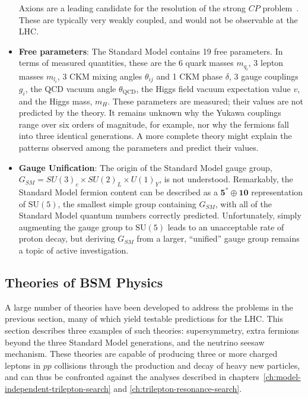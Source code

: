 \begin{itemize}
	Axions are a leading candidate for the resolution of the strong $CP$ problem~\cite{Peccei:400569}. These are typically very weakly coupled, and would not be observable at the LHC.

	\item \textbf{Free parameters}: The Standard Model contains 19 free parameters. In terms of measured quantities, these are the 6 quark masses $m_{q_i}$, 3 lepton masses $m_{l_i}$, 3 CKM mixing angles $\theta_{ij}$ and 1 CKM phase $\delta$, 3 gauge couplings $g_i$, the QCD vacuum angle $\theta_{\mathrm{QCD}}$, the Higgs field vacuum expectation value $v$, and the Higgs mass, $m_H$. These parameters are measured; their values are not predicted by the theory. It remains unknown why the Yukawa couplings range over six orders of magnitude, for example, nor why the fermions fall into three identical generations. A more complete theory might explain the patterns observed among the parameters and predict their values.


	\item \textbf{Gauge Unification}: The origin of the Standard Model gauge group, $G_{SM}=SU(3)_c\times SU(2)_L \times U(1)_Y$, is not understood. Remarkably, the Standard Model fermion content can be described as a $\mathbf{5}^{*}\oplus \mathbf{10}$ representation of $\mathrm{SU}(5)$, the smallest simple group containing $G_{SM}$, with all of the Standard Model quantum numbers correctly predicted. Unfortunately, simply augmenting the gauge group to $\mathrm{SU}(5)$ leads to an unacceptable rate of proton decay, but deriving $G_{SM}$ from a larger, ``unified'' gauge group remains a topic of active investigation.  
\end{itemize}

\subsection{Theories of BSM Physics}\label{sec:bsm-theories}
A large number of theories have been developed to address the problems in the previous section, many of which yield testable predictions for the LHC. This section describes three examples of such theories: supersymmetry, extra fermions beyond the three Standard Model generations, and the neutrino seesaw mechanism. These theories are capable of producing three or more charged leptons in $pp$ collisions through the production and decay of heavy new particles, and can thus be confronted against the analyses described in chapters~\ref{ch:model-independent-trilepton-search} and \ref{ch:trilepton-resonance-search}.

